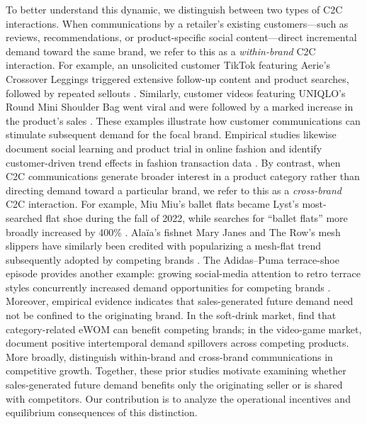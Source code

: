 \documentclass[nonblindrev,copyedit]{informs1}
\begin{document}
To better understand this dynamic, we distinguish between two types of C2C interactions. When communications by a retailer's existing customers---such as reviews, recommendations, or product-specific social content---direct incremental demand toward the same brand, we refer to this as a \textit{within-brand} C2C interaction. For example, an unsolicited customer TikTok featuring Aerie's Crossover Leggings triggered extensive follow-up content and product searches, followed by repeated sellouts \citep{businessinsider2021}. Similarly, customer videos featuring UNIQLO's Round Mini Shoulder Bag went viral and were followed by a marked increase in the product's sales \citep{guardian2023uniqlo}. These examples illustrate how customer communications can stimulate subsequent demand for the focal brand. Empirical studies likewise document social learning and product trial in online fashion and identify customer-driven trend effects in fashion transaction data \citep[see, e.g.,][]{lee2013,baardman2023}. By contrast, when C2C communications generate broader interest in a product category rather than directing demand toward a particular brand, we refer to this as a \textit{cross-brand} C2C interaction. For example, Miu Miu's ballet flats became Lyst's most-searched flat shoe during the fall of 2022, while searches for ``ballet flats'' more broadly increased by 400\% \citep{fashionista2022miumiu}. Alaïa's fishnet Mary Janes and The Row's mesh slippers have similarly been credited with popularizing a mesh-flat trend subsequently adopted by competing brands \citep{forbes2024mesh}. The Adidas--Puma terrace-shoe episode provides another example: growing social-media attention to retro terrace styles concurrently increased demand opportunities for competing brands \citep{reuters2023terrace,reuters2024puma}.
Moreover, empirical evidence indicates that sales-generated future demand need not be confined to the originating brand. In the soft-drink market, \cite{cola2020} find that category-related eWOM can benefit competing brands; in the video-game market, \cite{haviv2020} document positive intertemporal demand spillovers across competing products. More broadly, \cite{libai2009} distinguish within-brand and cross-brand communications in competitive growth. Together, these prior studies motivate examining whether sales-generated future demand benefits only the originating seller or is shared with competitors. Our contribution is to analyze the operational incentives and equilibrium consequences of this distinction.
\end{document}
